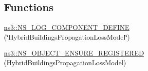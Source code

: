 \subsection*{Functions}
\begin{DoxyCompactItemize}
\item 
\hyperlink{namespacens3_a4b3fab81af058dbd962b1be8e62cb36c}{ns3\+::\+N\+S\+\_\+\+L\+O\+G\+\_\+\+C\+O\+M\+P\+O\+N\+E\+N\+T\+\_\+\+D\+E\+F\+I\+NE} (\char`\"{}Hybrid\+Buildings\+Propagation\+Loss\+Model\char`\"{})
\item 
\hyperlink{namespacens3_a46a77aaaa1ef5d89e95faf381407c2a8}{ns3\+::\+N\+S\+\_\+\+O\+B\+J\+E\+C\+T\+\_\+\+E\+N\+S\+U\+R\+E\+\_\+\+R\+E\+G\+I\+S\+T\+E\+R\+ED} (Hybrid\+Buildings\+Propagation\+Loss\+Model)
\end{DoxyCompactItemize}

